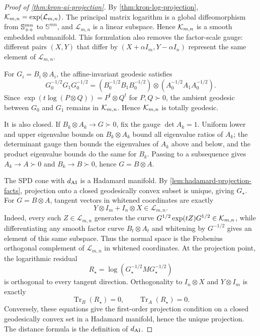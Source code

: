 \begin{proof}[Proof of \cref{thm:kron-ai-projection}]
By \cref{thm:kron-log-projection},
\(\mathcal K_{m,n}=\exp(\mathcal L_{m,n})\). The principal matrix logarithm is a
global diffeomorphism from \(\mathbb S_{++}^{mn}\) to \(\mathbb S^{mn}\), and
\(\mathcal L_{m,n}\) is a linear subspace. Hence \(\mathcal K_{m,n}\) is a smooth
embedded submanifold. This formulation also removes the factor-scale gauge:
different pairs \((X,Y)\) that differ by
\((X+\alpha I_m,Y-\alpha I_n)\) represent the same element of
\(\mathcal L_{m,n}\).

For \(G_i=B_i\otimes A_i\), the affine-invariant geodesic satisfies
\[
  G_0^{-1/2}G_1G_0^{-1/2}
  =
  (B_0^{-1/2}B_1B_0^{-1/2})
  \otimes
  (A_0^{-1/2}A_1A_0^{-1/2}).
\]
Since \(\exp(t\log(P\otimes Q))=P^t\otimes Q^t\) for \(P,Q\succ0\), the
ambient geodesic between \(G_0\) and \(G_1\) remains in \(\mathcal K_{m,n}\). Hence
\(\mathcal K_{m,n}\) is totally geodesic.

It is also closed. If \(B_k\otimes A_k\to G\succ0\), fix the gauge
\(\det A_k=1\). Uniform lower and upper eigenvalue bounds on
\(B_k\otimes A_k\) bound all eigenvalue ratios of \(A_k\); the determinant
gauge then bounds the eigenvalues of \(A_k\) above and below, and the product
eigenvalue bounds do the same for \(B_k\). Passing to a subsequence gives
\(A_k\to A\succ0\) and \(B_k\to B\succ0\), hence \(G=B\otimes A\).

The SPD cone with \(d_{\mathrm{AI}}\) is a Hadamard manifold. By
\cref{lem:hadamard-projection-facts}, projection onto a closed geodesically
convex subset is unique, giving \(G_\star\).
For \(G=B\otimes A\), tangent vectors in whitened coordinates are exactly
\[
  Y\otimes I_m+I_n\otimes X\in\mathcal L_{m,n}.
\]
Indeed, every such \(Z\in\mathcal L_{m,n}\) generates the curve
\(G^{1/2}\exp(tZ)G^{1/2}\in\mathcal K_{m,n}\), while differentiating any smooth
factor curve \(B_t\otimes A_t\) and whitening by \(G^{-1/2}\) gives an element
of this same subspace. Thus the normal space is the Frobenius orthogonal
complement of \(\mathcal L_{m,n}\) in whitened coordinates.
At the projection point, the logarithmic residual
\[
  R_\star=\log(G_\star^{-1/2}MG_\star^{-1/2})
\]
is orthogonal to every tangent direction. Orthogonality to
\(I_n\otimes X\) and \(Y\otimes I_m\) is exactly
\[
  \operatorname{Tr}_B(R_\star)=0,\qquad
  \operatorname{Tr}_A(R_\star)=0.
\]
Conversely, these equations give the first-order projection condition on a
closed geodesically convex set in a Hadamard manifold, hence the unique
projection. The distance formula is the definition of \(d_{\mathrm{AI}}\).
\end{proof}

